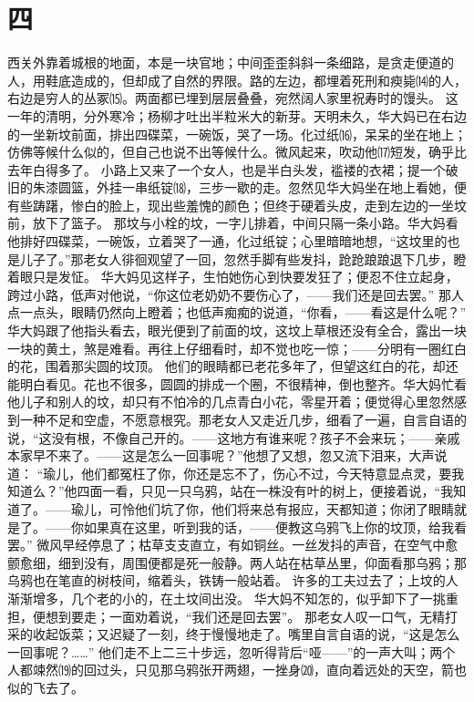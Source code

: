 \documentclass[12pt,UTF8]{ctexbook}
\begin{document}
\chapter{四}

西关外靠着城根的地面，本是一块官地；中间歪歪斜斜一条细路，是贪走便道的人，用鞋底造成的，但却成了自然的界限。路的左边，都埋着死刑和瘐毙⒁的人，右边是穷人的丛冢⒂。两面都已埋到层层叠叠，宛然阔人家里祝寿时的馒头。
这一年的清明，分外寒冷；杨柳才吐出半粒米大的新芽。天明未久，华大妈已在右边的一坐新坟前面，排出四碟菜，一碗饭，哭了一场。化过纸⒃，呆呆的坐在地上；仿佛等候什么似的，但自己也说不出等候什么。微风起来，吹动他⒄短发，确乎比去年白得多了。
小路上又来了一个女人，也是半白头发，褴褛的衣裙；提一个破旧的朱漆圆篮，外挂一串纸锭⒅，三步一歇的走。忽然见华大妈坐在地上看她，便有些踌躇，惨白的脸上，现出些羞愧的颜色；但终于硬着头皮，走到左边的一坐坟前，放下了篮子。
那坟与小栓的坟，一字儿排着，中间只隔一条小路。华大妈看他排好四碟菜，一碗饭，立着哭了一通，化过纸锭；心里暗暗地想，“这坟里的也是儿子了。”那老女人徘徊观望了一回，忽然手脚有些发抖，跄跄踉踉退下几步，瞪着眼只是发怔。
华大妈见这样子，生怕她伤心到快要发狂了；便忍不住立起身，跨过小路，低声对他说，“你这位老奶奶不要伤心了，——我们还是回去罢。”
那人点一点头，眼睛仍然向上瞪着；也低声痴痴的说道，“你看，——看这是什么呢？”
华大妈跟了他指头看去，眼光便到了前面的坟，这坟上草根还没有全合，露出一块一块的黄土，煞是难看。再往上仔细看时，却不觉也吃一惊；——分明有一圈红白的花，围着那尖圆的坟顶。
他们的眼睛都已老花多年了，但望这红白的花，却还能明白看见。花也不很多，圆圆的排成一个圈，不很精神，倒也整齐。华大妈忙看他儿子和别人的坟，却只有不怕冷的几点青白小花，零星开着；便觉得心里忽然感到一种不足和空虚，不愿意根究。那老女人又走近几步，细看了一遍，自言自语的说，“这没有根，不像自己开的。——这地方有谁来呢？孩子不会来玩；——亲戚本家早不来了。——这是怎么一回事呢？”他想了又想，忽又流下泪来，大声说道：
“瑜儿，他们都冤枉了你，你还是忘不了，伤心不过，今天特意显点灵，要我知道么？”他四面一看，只见一只乌鸦，站在一株没有叶的树上，便接着说，“我知道了。——瑜儿，可怜他们坑了你，他们将来总有报应，天都知道；你闭了眼睛就是了。——你如果真在这里，听到我的话，——便教这乌鸦飞上你的坟顶，给我看罢。”
微风早经停息了；枯草支支直立，有如铜丝。一丝发抖的声音，在空气中愈颤愈细，细到没有，周围便都是死一般静。两人站在枯草丛里，仰面看那乌鸦；那乌鸦也在笔直的树枝间，缩着头，铁铸一般站着。
许多的工夫过去了；上坟的人渐渐增多，几个老的小的，在土坟间出没。
华大妈不知怎的，似乎卸下了一挑重担，便想到要走；一面劝着说，“我们还是回去罢”。
那老女人叹一口气，无精打采的收起饭菜；又迟疑了一刻，终于慢慢地走了。嘴里自言自语的说，“这是怎么一回事呢？……”
他们走不上二三十步远，忽听得背后“哑——”的一声大叫；两个人都竦然⒆的回过头，只见那乌鸦张开两翅，一挫身⒇，直向着远处的天空，箭也似的飞去了。
\end{document}
